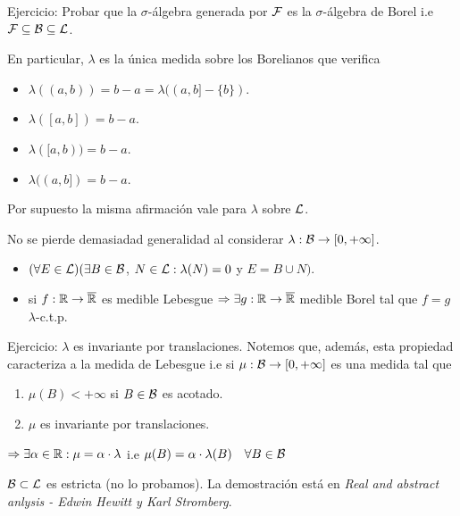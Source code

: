Ejercicio: Probar que la $\sigma$-álgebra generada por $\mathcal{F}$ es la $\sigma$-álgebra de Borel i.e $\mathcal{F} \subseteq \mathcal{B} \subseteq \mathcal{L}$.

En particular, $\lambda$ es la única medida sobre los Borelianos que verifica \begin{itemize}
    \item $\lambda((a, b)) = b - a = \lambda((a, b] - \{ b \})$.
    \item $\lambda([a, b]) = b - a$.
    \item $\lambda([a, b)) = b - a$.
    \item $\lambda((a, b]) = b - a$.
\end{itemize}

Por supuesto la misma afirmación vale para $\lambda$ sobre $\mathcal{L}$.

\begin{note}
    No se pierde demasiadad generalidad al considerar $\lambda : \mathcal{B} \to [0, +\infty]$.
    \begin{itemize}
        \item $(\forall E \in \mathcal{L}) (\exists B \in \mathcal{B}$, $N \in \mathcal{L} : \lambda(N) = 0$ y $E = B \cup N)$.
        \item si $f : \mathbb{R} \to \overline{\mathbb{R}}$ es medible Lebesgue $\Rightarrow \exists g : \mathbb{R} \to \overline{\mathbb{R}}$ medible Borel tal que $ f = g$ $\lambda$-c.t.p.
    \end{itemize}
\end{note}

Ejercicio: $\lambda$ es invariante por translaciones. Notemos que, además, esta propiedad caracteriza a la medida de Lebesgue i.e si $\mu : \mathcal{B} \to [0, +\infty]$ es una medida tal que \begin{enumerate}
    \item $\mu(B) < +\infty$ si $B \in \mathcal{B}$ es acotado.
    \item $\mu$ es invariante por translaciones.
\end{enumerate}
$\Rightarrow \exists \alpha \in \mathbb{R} : \mu = \alpha \cdot \lambda$ i.e $\mu(B) = \alpha \cdot \lambda(B) \quad \forall B \in \mathcal{B}$

\begin{note}
    $\mathcal{B} \subset \mathcal{L}$ es estricta (no lo probamos).
    La demostración está en \textit{Real and abstract anlysis - Edwin Hewitt y Karl Stromberg}.
\end{note}